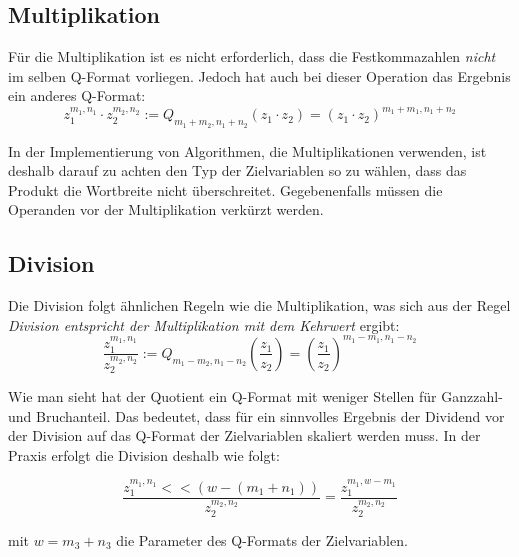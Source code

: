 \subsection{Multiplikation}
Für die Multiplikation ist es nicht erforderlich, dass die Festkommazahlen \emph{nicht} im selben Q-Format vorliegen. Jedoch hat auch bei dieser Operation das Ergebnis ein anderes Q-Format:
\[z_1^{m_1,n_1}\cdot z_2^{m_2,n_2} := Q_{m_1+m_2,n_1+n_2}(z_1\cdot z_2) = (z_1\cdot z_2)^{m_1+m_1,n_1+n_2}\]

In der Implementierung von Algorithmen, die Multiplikationen verwenden, ist deshalb darauf zu achten den Typ der Zielvariablen so zu wählen, dass das Produkt die Wortbreite nicht überschreitet. Gegebenenfalls müssen die Operanden vor der Multiplikation verkürzt werden.

\subsection{Division}
Die Division folgt ähnlichen Regeln wie die Multiplikation, was sich aus der Regel \emph{Division entspricht der Multiplikation mit dem Kehrwert} ergibt:
\[\frac{z_1^{m_1,n_1}}{z_2^{m_2,n_2}} := Q_{m_1-m_2,n_1-n_2}\left(\frac{z_1}{z_2}\right) = \left(\frac{z_1}{z_2}\right)^{m_1-m_1,n_1-n_2}\]

Wie man sieht hat der Quotient ein Q-Format mit weniger Stellen für Ganzzahl- und Bruchanteil. Das bedeutet, dass für ein sinnvolles Ergebnis der Dividend vor der Division auf das Q-Format der Zielvariablen skaliert werden muss. In der Praxis erfolgt die Division deshalb wie folgt:

\[\frac{z_1^{m_1,n_1}<<(w-(m_1+n_1))}{z_2^{m_2,n_2}} = \frac{z_1^{m_1,w-m_1}}{z_2^{m_2,n_2}} \]

mit $w=m_3+n_3$ die Parameter des Q-Formats der Zielvariablen.
